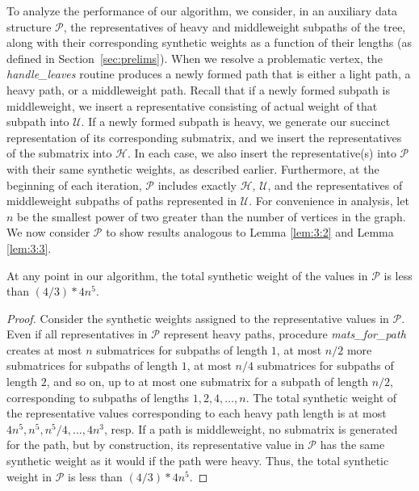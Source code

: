 To analyze the performance of our algorithm, we consider, in an auxiliary data structure $\mathcal{P}$, the representatives of heavy and middleweight subpaths of the tree, along with their corresponding synthetic weights as a function of their lengths (as defined in Section~\ref{sec:prelims}). 
When we resolve a problematic vertex, the {\it handle\_leaves} routine produces a newly formed path that is either a light path, a heavy path, or a middleweight path. 
Recall that if a newly formed subpath is middleweight, we insert a representative consisting of actual weight of that subpath into $\mathcal{U}$. 
If a newly formed subpath is heavy, we generate our succinct representation of its corresponding submatrix, and we insert the representatives of the submatrix into $\mathcal{H}$. 
In each case, we also insert the representative(s) into $\mathcal{P}$ with their same synthetic weights, as described earlier. 
Furthermore, at the beginning of each iteration, $\mathcal{P}$ includes exactly $\mathcal{H}$, $\mathcal{U}$, and the representatives of middleweight subpaths of paths represented in $\mathcal{U}$. 
For convenience in analysis, let $n$ be the smallest power of two greater than the number of vertices in the graph. 
We now consider $\mathcal{P}$ to show results analogous to Lemma \ref{lem:3:2} and Lemma \ref{lem:3:3}.

\begin{lemma}
\label{lem:weight:bound}
At any point in our algorithm, the total synthetic weight of the values in $\mathcal{P}$ is less than $(4/3)*4n^5$.
\end{lemma}
\begin{proof}
Consider the synthetic weights assigned to the representative values in $\mathcal{P}$. 
Even if all representatives in $\mathcal{P}$ represent heavy paths, 
procedure {\it mats\_for\_path} creates
at most $n$ submatrices for subpaths of length $1$,
at most $n/2$ more submatrices for subpaths of length $1$,
at most $n/4$ submatrices for subpaths of length $2$, and so on,
up to at most one submatrix for a subpath of length $n/2$, 
corresponding to subpaths of lengths $1, 2, 4, \ldots , n$.
The total synthetic weight of the representative values corresponding to each heavy path length is at most
$4n^5, n^5, n^5/4, \ldots , 4n^3$, resp.
If a path is middleweight, no submatrix is generated for the path, but by construction, its 
representative value in $\mathcal{P}$ has the same synthetic weight as it would if the path were heavy.  
Thus, the total synthetic weight in $\mathcal{P}$ is less than $(4/3)*4n^5$.
\end{proof}

